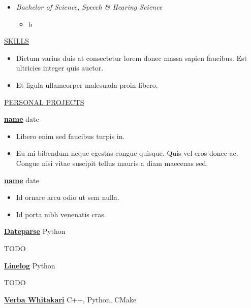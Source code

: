 \documentclass[11pt]{article}
\newcommand{\betteruline}[1]{
    \uline{#1}
}
\newcommand{\sectiontitle}[1]{
    \begingroup
        \titlebold
        \betteruline{\Large\uppercase{#1}  }
        \vspace{1.7mm}
    \endgroup
}
\newcommand{\sectioncontent}[1]{
    \begingroup
        \begin{FlushLeft}
        \vspace{-3mm}
        \sffamily\small#1
        \end{FlushLeft}
    \endgroup
    \vspace{2mm}
}
\newcommand{\project}[2]{
    \begingroup
        \textbf{\small#1}
        \hfill\color{black!70}\small{#2}
    \endgroup
}
\newcommand{\spacevv}{
    \vspace{2mm}
}
\begin{document}
\begin{paracol}{2}
{\begin{itemize}
\begin{itemize}
        \end{itemize}
      \item \textit{Bachelor of Science, Speech \& Hearing Science}

        \begin{itemize}
          \item b
        \end{itemize}
    \end{itemize}

          
      } 
    
    \sectiontitle{Skills}
    \sectioncontent{

      \begin{itemize}
        \item Dictum varius duis at consectetur lorem donec massa sapien faucibus. Est ultricies integer quis auctor. 
        \item Et ligula ullamcorper malesuada proin libero. 
      \end{itemize}
    }

    \sectiontitle{personal projects}
    \sectioncontent{

        \project{\href{example.com}{name}}{date}
        \begin{itemize}
            \item  Libero enim sed faucibus turpis in. 
            \item Eu mi bibendum neque egestas congue quisque. Quis vel eros donec ac. Congue nisi vitae suscipit tellus mauris a diam maecenas sed.
        \end{itemize}
        \spacevv

        \project{\href{example.com}{name}}{date}
        \begin{itemize}
            \item Id ornare arcu odio ut sem nulla. 
            \item Id porta nibh venenatis cras. 
        \end{itemize}
        \spacevv
       
        \project{\href{https://github.com/keagud/dateparse}{Dateparse}}{Python}
        TODO

               \spacevv

        \project{\href{https://github.com/keagud/linelog}{Linelog}}{Python}

        TODO
                \spacevv



        \project{\href{https://github.com/keagud/verba}{Verba Whitakari}}{C++, Python, CMake}

}
\end{paracol}
\end{document}
